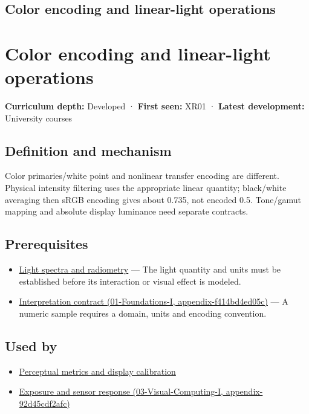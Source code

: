 \hypertarget{appendix-a9f83ad40792}{}
\section*{Color encoding and linear-light operations}
\chapter{Color encoding and linear-light operations}\label{appendix-a9f83ad40792-color-encoding-and-linear-light-operations}

\textbf{Curriculum depth:} Developed · \textbf{First seen:} XR01 · \textbf{Latest development:} University courses

\section{Definition and mechanism}\label{appendix-a9f83ad40792-definition-and-mechanism}

Color primaries/white point and nonlinear transfer encoding are different. Physical intensity filtering uses the appropriate linear quantity; black/white averaging then sRGB encoding gives about 0.735, not encoded 0.5. Tone/gamut mapping and absolute display luminance need separate contracts.

\section{Prerequisites}\label{appendix-a9f83ad40792-prerequisites}

\begin{itemize}
\tightlist
\item
  \hyperref[appendix-215c2570199b]{Light spectra and radiometry} --- The light quantity and units must be established before its interaction or visual effect is modeled.
\item
  \href{../01-Foundations-I/main.pdf\#nameddest=appendix-f414bd4ed05c}{Interpretation contract (01-Foundations-I, appendix-f414bd4ed05c)} --- A numeric sample requires a domain, units and encoding convention.
\end{itemize}

\section{Used by}\label{appendix-a9f83ad40792-used-by}

\begin{itemize}
\tightlist
\item
  \hyperref[appendix-b2c1846508bf]{Perceptual metrics and display calibration}
\item
  \href{../03-Visual-Computing-I/main.pdf\#nameddest=appendix-92d45cdf2afc}{Exposure and sensor response (03-Visual-Computing-I, appendix-92d45cdf2afc)}
\end{itemize}

